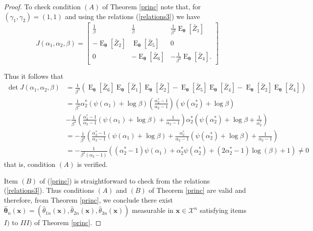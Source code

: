 \documentclass[lineno]{biometrika}
\newcommand{\bs}{\boldsymbol}
\newcommand{\on}{\operatorname}
\begin{document}
\begin{proof}
To check condition $(A)$ of Theorem \ref{princ} note that, for $(\gamma_1,\gamma_2)=(1,1)$ and using the relations (\ref{relations3}) we have
\begin{equation}\label{mfishergg2}
J(\alpha_1,\alpha_2,\beta)=
\begin{bmatrix}
 \frac{1}{\beta}  & \frac{1}{\beta} &  \frac{1}{\beta^3}\on{E}_{\bs{\theta}}\left[\bar{Z}_1\right]\\
 -\on{E}_{\bs{\theta}}\left[\bar{Z}_2\right] &  \on{E}_{\bs{\theta}}\left[\bar{Z}_5\right] & 0\\
 0 & - \on{E}_{\bs{\theta}}\left[\bar{Z}_6\right] & - \frac{1}{\beta^2} \on{E}_{\bs{\theta}}\left[\bar{Z}_4\right].
\end{bmatrix}
\end{equation}

Thus it follows that
\begin{equation*}
\begin{aligned}
 \on{det} J(\alpha_1,\alpha_2,\beta) &= \frac{1}{\beta^3}\left(\on{E}_{\bs{\theta}}\left[\bar{Z}_6\right]\on{E}_{\bs{\theta}}\left[\bar{Z}_1\right]\on{E}_{\bs{\theta}}\left[\bar{Z}_2\right] - \on{E}_{\bs{\theta}}\left[\bar{Z}_5\right]\on{E}_{\bs{\theta}}\left[\bar{Z}_4\right] - \on{E}_{\bs{\theta}}\left[\bar{Z}_2\right]\on{E}_{\bs{\theta}}\left[\bar{Z}_4\right]\right)\\
&= \frac{1}{\beta^2} \alpha_2^*(\psi(\alpha_1)+\log\beta) \left(\frac{\alpha_2^*-1}{\alpha_2 - 1}\right)(\psi(\alpha_2^*) + \log \beta)\\
& - \frac{1}{\beta^2}\left(\frac{\alpha_2^*-1}{\alpha_2-1}(\psi(\alpha_1)+\log \beta)+\frac{1}{\alpha_2-1} \right)\alpha_2^*\left(\psi(\alpha_2^*) + \log \beta + \frac{1}{\alpha_2^*}\right)
\\
& = -\frac{1}{\beta^2}\left(\frac{\alpha_2^*-1}{\alpha_2-1}(\psi(\alpha_1)+\log\beta) + \frac{\alpha_2^*}{\alpha_2-1}\left(\psi(\alpha_2^*)+\log \beta\right) + \frac{1}{\alpha_2-1}\right)\\
& =-\frac{1}{\beta^2(\alpha_2-1)}\left((\alpha_2^*-1)\psi(\alpha_1) + \alpha_2^*\psi(\alpha_2^*) + (2\alpha_2^*-1)\log(\beta) + 1\right)\neq 0
\end{aligned}
\end{equation*}
that is, condition $(A)$ is verified. 

Item $(B)$ of (\ref{princ}) is straightforward to check from the relations (\ref{relations3}). Thus conditions $(A)$ and $(B)$ of Theorem \ref{princ} are valid and therefore, from Theorem \ref{princ}, we conclude there exist $\bs{\hat{\theta}}_n(\bs{x})=(\hat{\theta}_{1n}(\bs{x}),\hat{\theta}_{2n}(\bs{x}),\hat{\theta}_{3n}(\bs{x}))$ measurable in $\bs{x}\in \mathcal{X}^n$ satisfying items $I)$ to $III)$ of Theorem \ref{princ}.


\end{proof}
\end{document}
